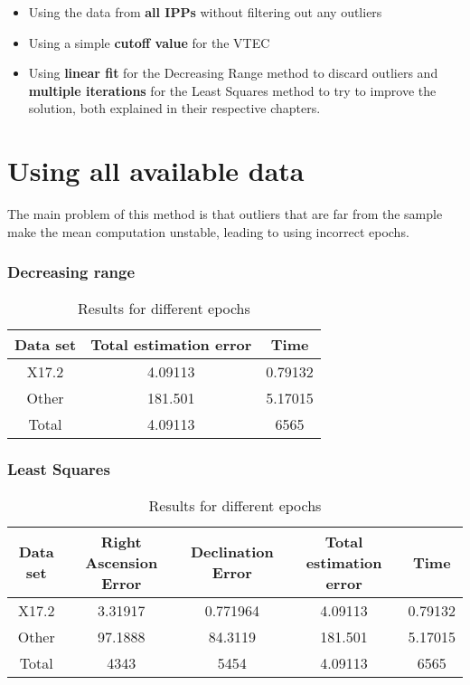 \begin{itemize}
	\item Using the data from \textbf{all IPPs} without filtering out any outliers
	\item Using a simple \textbf{cutoff value} for the VTEC
	\item Using \textbf{linear fit} for the Decreasing Range method to discard outliers and \textbf{multiple iterations} for the Least Squares method to try to improve the solution, both explained in their respective chapters.
\end{itemize}

\section{Using all available data}

The main problem of this method is that outliers that are far from the sample make the mean computation unstable, leading to using incorrect epochs.

\subsubsection{Decreasing range}

\begin{table}[h!]
	\centering
	\def\arraystretch{1.2}
	\begin{tabular}{|c c c|} 
		\hline
		Data set & Total estimation error & Time \\ [0.5ex] 
		\hline\hline
		X17.2  & 4.09113 & 0.79132 \\
		\hline
		Other & 181.501 & 5.17015 \\
		\hline\hline
		Total & 4.09113 & 6565 \\
		\hline
	\end{tabular}
	\caption{Results for different epochs}
\end{table}

\subsubsection{Least Squares}

\begin{table}[h!]
	\centering
	\def\arraystretch{1.2}
	\begin{tabular}{|c c c c c|} 
		\hline
		Data set & Right Ascension Error & Declination Error & Total estimation error & Time \\ [0.5ex] 
		\hline\hline
		X17.2 & 3.31917 & 0.771964 & 4.09113 & 0.79132 \\
		\hline
		Other & 97.1888 & 84.3119 & 181.501 & 5.17015 \\
		\hline\hline
		Total & 4343 & 5454 & 4.09113 & 6565 \\
		\hline
	\end{tabular}
	\caption{Results for different epochs}
\end{table}

